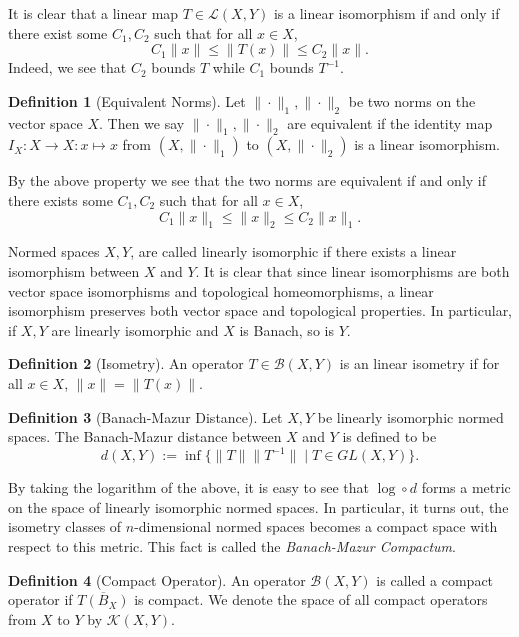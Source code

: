\documentclass[
]{article}
\theoremstyle{definition}
\theoremstyle{definition}
\newtheorem{definition}{Definition}[section]
\begin{document}
It is clear that a linear map \(T \in \mathcal{L}(X, Y)\) is a linear isomorphism 
if and only if there exist some \(C_1, C_2\) such that for all \(x \in X\), 
\[C_1\|x\| \le \|T(x)\| \le C_2 \|x\|.\]
Indeed, we see that \(C_2\) bounds \(T\) while \(C_1\) bounds \(T^{-1}\).

\begin{definition}[Equivalent Norms]
  Let \(\|\cdot\|_1, \|\cdot\|_2\) be two norms on the vector space \(X\). Then 
  we say \(\|\cdot\|_1, \|\cdot\|_2\) are equivalent if the identity map 
  \(I_X : X \to X : x \mapsto x\) from \((X, \|\cdot\|_1)\) to \((X, \|\cdot\|_2)\) 
  is a linear isomorphism.
\end{definition}

By the above property we see that the two norms are equivalent if and only if 
there exists some \(C_1, C_2\) such that for all \(x \in X\), 
\[C_1 \|x\|_1 \le \|x\|_2 \le C_2 \|x\|_1.\]

Normed spaces \(X, Y\), are called linearly isomorphic if there exists a linear 
isomorphism between \(X\) and \(Y\). It is clear that since linear isomorphisms 
are both vector space isomorphisms and topological homeomorphisms, a linear 
isomorphism preserves both vector space and topological properties. In particular, 
if \(X, Y\) are linearly isomorphic and \(X\) is Banach, so is \(Y\).

\begin{definition}[Isometry]
  An operator \(T \in \mathcal{B}(X, Y)\) is an linear isometry if for all 
  \(x \in X\), \(\|x\| = \|T(x)\|\).
\end{definition}

\begin{definition}[Banach-Mazur Distance]
  Let \(X, Y\) be linearly isomorphic normed spaces. The Banach-Mazur distance 
  between \(X\) and \(Y\) is defined to be 
  \[d(X, Y) := \inf \{\|T\| \|T^{-1}\| \mid T \in GL(X, Y)\}.\]
\end{definition}

By taking the logarithm of the above, it is easy to see that \(\log \circ d\) 
forms a metric on the space of linearly isomorphic normed spaces. In particular, 
it turns out, the isometry classes of \(n\)-dimensional normed spaces becomes 
a compact space with respect to this metric. This fact is called the 
\textit{Banach-Mazur Compactum}.

\begin{definition}[Compact Operator]
  An operator \(\mathcal{B}(X, Y)\) is called a compact operator if 
  \(\overline{T(B_X)}\) is compact. We denote the space of all compact operators 
  from \(X\) to \(Y\) by \(\mathcal{K}(X, Y)\).
\end{definition}
\end{document}
